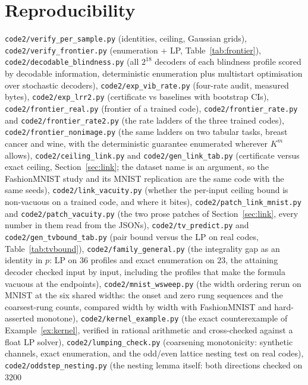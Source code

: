 \documentclass[11pt]{article}
\begin{document}
\section{Reproducibility}
\texttt{code2/verify\_per\_sample.py} (identities, ceiling, Gaussian grids),
\texttt{code2/verify\_frontier.py} (enumeration + LP, Table~\ref{tab:frontier}),
\texttt{code2/decodable\_blindness.py} (all $2^{18}$ decoders of each blindness profile scored by
decodable information, deterministic enumeration plus multistart optimisation over stochastic
decoders),
\texttt{code2/exp\_vib\_rate.py} (four-rate audit, measured bytes),
\texttt{code2/exp\_lrr2.py} (certificate vs baselines with bootstrap CIs),
\texttt{code2/frontier\_real.py} (frontier of a trained code),
\texttt{code2/frontier\_rate.py} and \texttt{code2/frontier\_rate2.py} (the rate ladders of the
three trained codes), \texttt{code2/frontier\_nonimage.py} (the same ladders on two tabular tasks,
breast cancer and wine, with the deterministic guarantee enumerated wherever $K^m$ allows), \texttt{code2/ceiling\_link.py} and \texttt{code2/gen\_link\_tab.py} (certificate versus
exact ceiling, Section~\ref{sec:link}; the dataset name is an argument, so the FashionMNIST study and
its MNIST replication are the same code with the same seeds),
\texttt{code2/link\_vacuity.py} (whether the per-input ceiling bound is non-vacuous on a trained
code, and where it bites), \texttt{code2/patch\_link\_mnist.py} and
\texttt{code2/patch\_vacuity.py} (the two prose patches of Section~\ref{sec:link}, every number in
them read from the JSONs),
\texttt{code2/tv\_predict.py} and \texttt{code2/gen\_tvbound\_tab.py} (pair bound versus
the LP on real codes, Table~\ref{tab:tvbound}), \texttt{code2/family\_general.py} (the integrality
gap as an identity in $p$: LP on $36$ profiles and exact enumeration on $23$, the attaining decoder
checked input by input, including the profiles that make the formula vacuous at the endpoints),
\texttt{code2/mnist\_wsweep.py} (the width ordering rerun on MNIST at the six shared widths: the
onset and zero rung sequences and the coarsest-rung counts, compared width by width with
FashionMNIST and hard-asserted monotone),
\texttt{code2/kernel\_example.py} (the exact counterexample of
Example~\ref{ex:kernel}, verified in rational arithmetic and cross-checked against a float LP
solver), \texttt{code2/lumping\_check.py} (coarsening monotonicity: synthetic channels, exact
enumeration, and the odd/even lattice nesting test on real codes),
\texttt{code2/oddstep\_nesting.py} (the nesting lemma itself: both directions checked on $3200$
\end{document}
